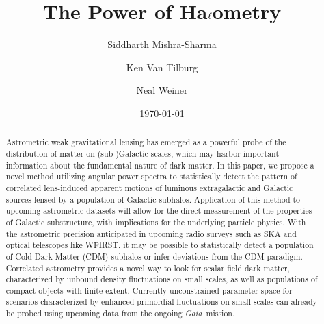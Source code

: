 \documentclass[prd,aps,10pt,nofootinbib,twocolumn,superscriptaddress,preprintnumbers,balancelastpage,longbibliography]{revtex4-1}
\newcommand{\Gaia}{\emph{Gaia}}
\begin{document}
\title{The Power of Ha$\boldmath\ell$ometry}
\author{Siddharth Mishra-Sharma}
\author{Ken Van Tilburg}
\author{Neal Weiner}

\date{\today}

\begin{abstract}
Astrometric weak gravitational lensing has emerged as a powerful probe of the distribution of matter on (sub-)Galactic scales, which may harbor important information about the fundamental nature of dark matter. In this paper, we propose a novel method utilizing angular power spectra to statistically detect the pattern of correlated lens-induced apparent motions of luminous extragalactic and Galactic sources lensed by a population of Galactic subhalos. Application of this method to upcoming astrometric datasets will allow for the direct measurement of the properties of Galactic substructure, with implications for the underlying particle physics. With the astrometric precision anticipated in upcoming radio surveys such as SKA and optical telescopes like WFIRST, it may be possible to statistically detect a population of Cold Dark Matter (CDM) subhalos or infer deviations from the CDM paradigm. Correlated astrometry provides a novel way to look for scalar field dark matter, characterized by unbound density fluctuations on small scales, as well as populations of compact objects with finite extent. Currently unconstrained parameter space for scenarios characterized by enhanced primordial fluctuations on small scales can already be probed using upcoming data from the ongoing \Gaia~mission. \href{https://github.com/smsharma/Lensing-PowerSpectra}{\faGithub}
\end{abstract}

\maketitle
\end{document}
